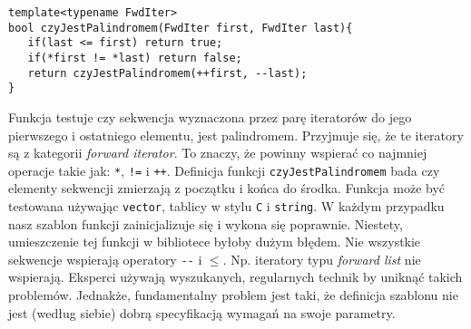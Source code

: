 \documentclass[11pt, a4paper]{article}
\begin{document}
\begin{lstlisting}[frame=single]
template<typename FwdIter>
bool czyJestPalindromem(FwdIter first, FwdIter last){
   if(last <= first) return true;
   if(*first != *last) return false;
   return czyJestPalindromem(++first, --last);
}

\end{lstlisting}

Funkcja testuje czy sekwencja wyznaczona przez parę iteratorów do jego pierwszego i ostatniego elementu, jest palindromem. Przyjmuje się, że te iteratory są z kategorii \emph{forward iterator}. To znaczy, że powinny wspierać co najmniej operacje takie jak: \verb#*#, \verb#!=# i \verb#++#. Definicja funkcji \verb#czyJestPalindromem# bada czy elementy sekwencji zmierzają z początku i końca do środka. Funkcja może być testowana używając \verb#vector#, tablicy w stylu \verb#C# i \verb#string#. W każdym przypadku nasz szablon funkcji zainicjalizuje się i wykona się poprawnie. Niestety, umieszczenie tej funkcji w bibliotece byłoby dużym błędem. Nie wszystkie sekwencje wspierają operatory \verb#--# i $\leq$. Np. iteratory typu \emph{forward list} nie wspierają. Eksperci używają wyszukanych, regularnych technik by uniknąć takich problemów. Jednakże, fundamentalny problem jest taki, że definicja szablonu nie jest (według siebie) dobrą specyfikacją wymagań na swoje parametry.
\end{document}
